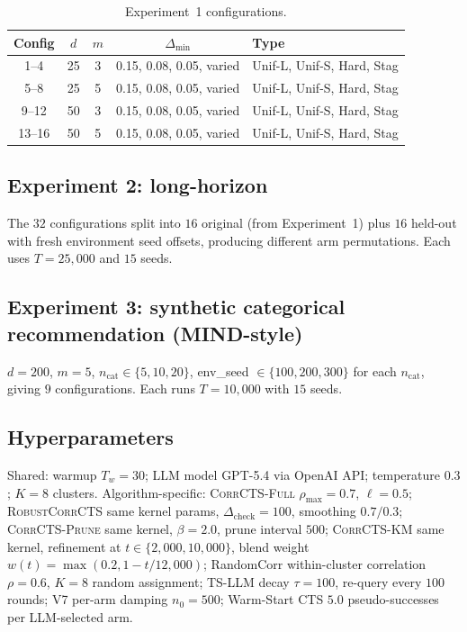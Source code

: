 \documentclass{article}
\theoremstyle{plain}
\theoremstyle{definition}
\theoremstyle{remark}
\newcommand{\gap}{\Delta_{\min}}
\newcommand{\CorrFull}{\textsc{CorrCTS-Full}}
\newcommand{\RobustCorr}{\textsc{RobustCorrCTS}}
\newcommand{\EdgePrune}{\textsc{CorrCTS-Prune}}
\newcommand{\KMRefine}{\textsc{CorrCTS-KM}}
\begin{document}
\begin{table}[h]
\caption{Experiment~1 configurations.}
\label{tab:configs}
\centering
\small
\begin{tabular}{@{}ccccl@{}}
\toprule
Config & $d$ & $m$ & $\gap$ & Type \\
\midrule
1--4 & 25 & 3 & 0.15, 0.08, 0.05, varied & Unif-L, Unif-S, Hard, Stag \\
5--8 & 25 & 5 & 0.15, 0.08, 0.05, varied & Unif-L, Unif-S, Hard, Stag \\
9--12 & 50 & 3 & 0.15, 0.08, 0.05, varied & Unif-L, Unif-S, Hard, Stag \\
13--16 & 50 & 5 & 0.15, 0.08, 0.05, varied & Unif-L, Unif-S, Hard, Stag \\
\bottomrule
\end{tabular}
\end{table}

\subsection{Experiment 2: long-horizon}

The $32$ configurations split into $16$ original (from Experiment~1) plus $16$ held-out with fresh environment seed offsets, producing different arm permutations.
Each uses $T = 25{,}000$ and $15$ seeds.

\subsection{Experiment 3: synthetic categorical recommendation (MIND-style)}

$d = 200$, $m = 5$, $n_\text{cat} \in \{5, 10, 20\}$, env\_seed $\in \{100, 200, 300\}$ for each $n_\text{cat}$, giving $9$ configurations.
Each runs $T = 10{,}000$ with $15$ seeds.

\subsection{Hyperparameters}

Shared: warmup $T_w = 30$; LLM model GPT-5.4 via OpenAI API; temperature $0.3$; $K = 8$ clusters.
Algorithm-specific: \CorrFull{} $\rho_{\max} = 0.7$, $\ell = 0.5$; \RobustCorr{} same kernel params, $\Delta_{\text{check}} = 100$, smoothing $0.7/0.3$; \EdgePrune{} same kernel, $\beta = 2.0$, prune interval $500$; \KMRefine{} same kernel, refinement at $t \in \{2{,}000, 10{,}000\}$, blend weight $w(t) = \max(0.2, 1 - t/12{,}000)$; RandomCorr within-cluster correlation $\rho = 0.6$, $K = 8$ random assignment; TS-LLM decay $\tau = 100$, re-query every $100$ rounds; V7 per-arm damping $n_0 = 500$; Warm-Start CTS $5.0$ pseudo-successes per LLM-selected arm.
\end{document}
